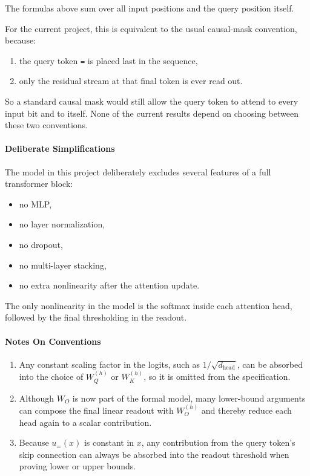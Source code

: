 \documentclass{article}
\theoremstyle{definition}
\theoremstyle{plain}
\begin{document}
\begin{sourcebox}
The formulas above sum over all input positions and the query position itself.

For the current project, this is equivalent to the usual causal-mask convention, because:

\begin{enumerate}[leftmargin=*,nosep]
  \item the query token \texttt{=} is placed last in the sequence,
  \item only the residual stream at that final token is ever read out.
\end{enumerate}

So a standard causal mask would still allow the query token to attend to every input bit and to itself. None of the current results depend on choosing between these two conventions.

\paragraph{Deliberate Simplifications}

The model in this project deliberately excludes several features of a full transformer block:

\begin{itemize}[leftmargin=*,nosep]
  \item no MLP,
  \item no layer normalization,
  \item no dropout,
  \item no multi-layer stacking,
  \item no extra nonlinearity after the attention update.
\end{itemize}

The only nonlinearity in the model is the softmax inside each attention head, followed by the final thresholding in the readout.

\paragraph{Notes On Conventions}

\begin{enumerate}[leftmargin=*,nosep]
  \item Any constant scaling factor in the logits, such as $1 / \sqrt{d_{\mathrm{head}}}$, can be absorbed into the choice of $W_Q^{(h)}$ or $W_K^{(h)}$, so it is omitted from the specification.
  \item Although $W_O$ is now part of the formal model, many lower-bound arguments can compose the final linear readout with $W_O^{(h)}$ and thereby reduce each head again to a scalar contribution.
  \item Because $u_=(x)$ is constant in $x$, any contribution from the query token's skip connection can always be absorbed into the readout threshold when proving lower or upper bounds.
\end{enumerate}
\end{sourcebox}
\end{document}
